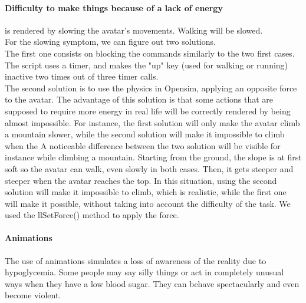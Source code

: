 \paragraph{Difficulty to make things because of a lack of energy} is rendered by slowing the avatar's movements. Walking will be slowed. \\

% 

For the slowing symptom, we can figure out two solutions.\\ The first one consists on blocking the commands similarly to the two first cases. The script uses a timer, and makes the "up" key (used for walking or running) inactive two times out of three timer calls.\\
The second solution is to use the physics in Opensim, applying an opposite force to the avatar. 
The advantage of this solution is that some actions that are supposed to require more energy in real life will be correctly rendered by being almost impossible. 
For instance, the first solution will only make the avatar climb a mountain slower, while the second solution will make it impossible to climb when the 
A noticeable difference between the two solution will be visible for instance while climbing a mountain. 
Starting from the ground, the slope is at first soft so the avatar can walk, even slowly in both cases. Then, it gets steeper and steeper when the avatar reaches the top. 
In this situation, using the second solution will make it impossible to climb, which is realistic, while the first one will make it possible, without taking into account the difficulty of the task. We used the llSetForce() method to apply the force.\\

\paragraph{Animations} The use of animations simulates a loss of awareness of the reality due to hypoglycemia. 
Some people may say silly things or act in completely unusual ways when they have a low blood sugar.
They can behave spectacularly and even become violent.\\ 

